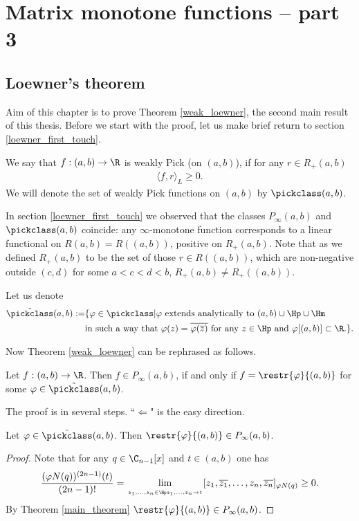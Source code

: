 \chapter{Matrix monotone functions -- part 3}

\section{Loewner's theorem}

Aim of this chapter is to prove Theorem \ref{weak_loewner}, the second main result of this thesis. Before we start with the proof, let us make brief return to section \ref{loewner_first_touch}.

\begin{maar}
	We say that $f : (a, b) \to \R$ is weakly Pick (on $(a, b)$), if for any $r \in R_{+}(a, b)$
	\begin{align*}
		\langle f, r\rangle_{L} \geq 0.
	\end{align*}
	We will denote the set of weakly Pick functions on $(a, b)$ by $\pickclass(a, b)$.
\end{maar}

In section \ref{loewner_first_touch} we observed that the classes $P_{\infty}(a, b)$ and  $\pickclass(a, b)$ coincide: any $\infty$-monotone function corresponds to a linear functional on $R(a, b) = R((a, b))$, positive on $R_{+}(a, b)$. Note that as we defined $R_{+}(a, b)$ to be the set of those $r \in R((a, b))$, which are non-negative outside $(c, d)$ for some $a < c < d < b$, $R_{+}(a, b) \neq R_{+}((a, b))$.

Let us denote
\begin{align*}
	\tilde{\pickclass}(a, b) :=& \{\varphi \in \pickclass | \text{$\varphi$ extends analytically to $(a, b) \cup \Hp \cup \Hm$} \\
	&\text{in such a way that $\varphi(z) = \overline{\varphi(\overline{z})}$ for any $z \in \Hp$ and $\varphi[(a, b)] \subset \R.$}\}.
\end{align*}

Now Theorem \ref{weak_loewner} can be rephrased as follows.
\begin{lause}\label{better_weak_loewner}
	Let $f : (a, b) \to \R$. Then $f \in P_{\infty}(a, b)$, if and only if $f = \restr{\varphi}{(a, b)}$ for some $\varphi \in \tilde{\pickclass}(a, b)$.
\end{lause}

The proof is in several steps. ``$\Leftarrow$" is the easy direction.
\begin{lem}\label{loewner_easy}
	Let $\varphi \in \tilde{\pickclass}(a, b)$. Then $\restr{\varphi}{(a, b)} \in P_{\infty}(a, b)$.
\end{lem}
\begin{proof}
	Note that for any $q \in \C_{n - 1}[x]$ and $t \in (a, b)$ one has
	\begin{align*}
		\frac{(\varphi N(q))^{(2 n - 1)}(t)}{(2 n - 1)!} = \lim_{\atop{z_{1}, \ldots, z_{n} \in \Hp}{z_{1}, \ldots, z_{n} \to t}} [z_{1}, \overline{z_{1}}, \ldots, z_{n}, \overline{z_{n}}]_{\varphi N(q)} \geq 0.
	\end{align*}
	By Theorem \ref{main_theorem} $\restr{\varphi}{(a, b)} \in P_{\infty}(a, b)$.
\end{proof}

